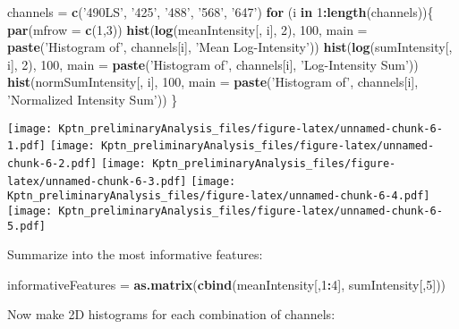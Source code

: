 \documentclass[]{article}
\newenvironment{Shaded}{\begin{snugshade}}{\end{snugshade}}
\newcommand{\ControlFlowTok}[1]{\textcolor[rgb]{0.13,0.29,0.53}{\textbf{#1}}}
\newcommand{\DataTypeTok}[1]{\textcolor[rgb]{0.13,0.29,0.53}{#1}}
\newcommand{\DecValTok}[1]{\textcolor[rgb]{0.00,0.00,0.81}{#1}}
\newcommand{\KeywordTok}[1]{\textcolor[rgb]{0.13,0.29,0.53}{\textbf{#1}}}
\newcommand{\NormalTok}[1]{#1}
\newcommand{\OperatorTok}[1]{\textcolor[rgb]{0.81,0.36,0.00}{\textbf{#1}}}
\newcommand{\StringTok}[1]{\textcolor[rgb]{0.31,0.60,0.02}{#1}}
\begin{document}
\begin{Shaded}
\begin{Highlighting}[]
\NormalTok{channels =}\StringTok{ }\KeywordTok{c}\NormalTok{(}\StringTok{'490LS'}\NormalTok{, }\StringTok{'425'}\NormalTok{, }\StringTok{'488'}\NormalTok{, }\StringTok{'568'}\NormalTok{, }\StringTok{'647'}\NormalTok{)}
\ControlFlowTok{for}\NormalTok{ (i }\ControlFlowTok{in} \DecValTok{1}\OperatorTok{:}\KeywordTok{length}\NormalTok{(channels))\{}
\KeywordTok{par}\NormalTok{(}\DataTypeTok{mfrow =} \KeywordTok{c}\NormalTok{(}\DecValTok{1}\NormalTok{,}\DecValTok{3}\NormalTok{))}
\KeywordTok{hist}\NormalTok{(}\KeywordTok{log}\NormalTok{(meanIntensity[, i], }\DecValTok{2}\NormalTok{), }\DecValTok{100}\NormalTok{, }\DataTypeTok{main =} \KeywordTok{paste}\NormalTok{(}\StringTok{'Histogram of'}\NormalTok{, channels[i], }\StringTok{'Mean Log-Intensity'}\NormalTok{))}
\KeywordTok{hist}\NormalTok{(}\KeywordTok{log}\NormalTok{(sumIntensity[, i], }\DecValTok{2}\NormalTok{), }\DecValTok{100}\NormalTok{, }\DataTypeTok{main =} \KeywordTok{paste}\NormalTok{(}\StringTok{'Histogram of'}\NormalTok{, channels[i], }\StringTok{'Log-Intensity Sum'}\NormalTok{))}
\KeywordTok{hist}\NormalTok{(normSumIntensity[, i], }\DecValTok{100}\NormalTok{, }\DataTypeTok{main =} \KeywordTok{paste}\NormalTok{(}\StringTok{'Histogram of'}\NormalTok{, channels[i], }\StringTok{'Normalized Intensity Sum'}\NormalTok{))}
\NormalTok{\}}
\end{Highlighting}
\end{Shaded}

\texttt{[image: Kptn\_preliminaryAnalysis\_files/figure-latex/unnamed-chunk-6-1.pdf]}
\texttt{[image: Kptn\_preliminaryAnalysis\_files/figure-latex/unnamed-chunk-6-2.pdf]}
\texttt{[image: Kptn\_preliminaryAnalysis\_files/figure-latex/unnamed-chunk-6-3.pdf]}
\texttt{[image: Kptn\_preliminaryAnalysis\_files/figure-latex/unnamed-chunk-6-4.pdf]}
\texttt{[image: Kptn\_preliminaryAnalysis\_files/figure-latex/unnamed-chunk-6-5.pdf]}

Summarize into the most informative features:

\begin{Shaded}
\begin{Highlighting}[]
\NormalTok{informativeFeatures =}\StringTok{ }\KeywordTok{as.matrix}\NormalTok{(}\KeywordTok{cbind}\NormalTok{(meanIntensity[,}\DecValTok{1}\OperatorTok{:}\DecValTok{4}\NormalTok{], sumIntensity[,}\DecValTok{5}\NormalTok{]))}
\end{Highlighting}
\end{Shaded}

Now make 2D histograms for each combination of channels:
\end{document}
